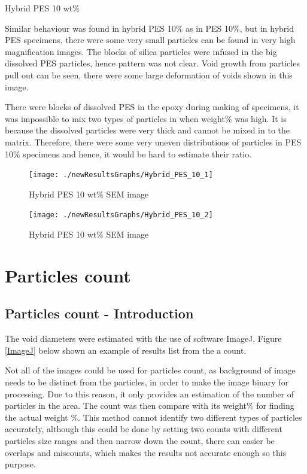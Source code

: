 \documentclass[numbers=noendperiod,chapterprefix=on]{icldt} %
\begin{document}
Hybrid PES 10 wt\%

Similar behaviour was found in hybrid PES 10\% as in PES 10\%, but in hybrid PES specimens, there were some very small particles can be found in very high magnification images. The blocks of silica particles were infused in the big dissolved PES particles, hence pattern was not clear. Void growth from particles pull out can be seen, there were some large deformation of voids shown in this image.

There were blocks of dissolved PES in the epoxy during making of specimens, it was impossible to mix two types of particles in when weight\% was high. It is because the dissolved particles were very thick and cannot be mixed in to the matrix. Therefore, there were some very uneven distributions of particles in PES 10\% specimens and hence, it would be hard to estimate their ratio. 

\begin{figure}[!hp]
\centering
\texttt{[image: ./newResultsGraphs/Hybrid\_PES\_10\_1]}
\caption{Hybrid PES 10 wt\% SEM image} \label{Hybrid_PES_10_1}
\end{figure}
\FloatBarrier

\begin{figure}[!hp]
\centering
\texttt{[image: ./newResultsGraphs/Hybrid\_PES\_10\_2]}
\caption{Hybrid PES 10 wt\% SEM image} \label{Hybrid_PES_10_2}
\end{figure}
\FloatBarrier



\section{Particles count} \label{Particles_count}

\subsection{Particles count - Introduction}
The void diameters were estimated with the use of software ImageJ, Figure \ref{ImageJ} below shown an example of results list from the a count. 

Not all of the images could be used for particles count, as background of image needs to be distinct from the particles, in order to make the image binary for processing. Due to this reason, it only provides an estimation of the number of particles in the area. The count was then compare with its weight\% for finding the actual weight \%. 
This method cannot identify two different types of particles accurately, although this could be done by setting two counts with different particles size ranges and then narrow down the count, there can easier be overlaps and miscounts, which makes the results not accurate enough so this purpose.
\end{document}
